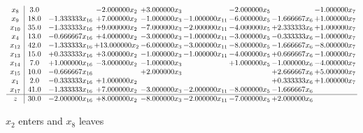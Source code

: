 \documentclass[10pt]{article}
\begin{document}
 \[\begin{array}{c| c c@{\hskip 2pt} c@{\hskip 2pt} c@{\hskip 2pt} c@{\hskip 2pt} c@{\hskip 2pt} c@{\hskip 2pt} c@{\hskip 2pt} }
 x_{8}   &  3.0  &   & -2.000000 x_{2} & + 3.000000 x_{3} &   & -2.000000 x_{5} &   & -1.000000 x_{7}\\
 x_{9}   &  18.0 & -1.333333 x_{16} & + 7.000000 x_{2} & -1.000000 x_{3} & -1.000000 x_{11} & -6.000000 x_{5} & -1.666667 x_{6} & + 1.000000 x_{7}\\
 x_{10}   &  35.0 & -1.333333 x_{16} & + 9.000000 x_{2} & -7.000000 x_{3} & -2.000000 x_{11} & -4.000000 x_{5} & + 2.333333 x_{6} & + 1.000000 x_{7}\\
 x_{4}   &  13.0 & -0.666667 x_{16} & + 4.000000 x_{2} & -3.000000 x_{3} & -1.000000 x_{11} & -3.000000 x_{5} & -0.333333 x_{6} & -1.000000 x_{7}\\
 x_{12}   &  42.0 & -1.333333 x_{16} & + 13.000000 x_{2} & -6.000000 x_{3} & -3.000000 x_{11} & -8.000000 x_{5} & -1.666667 x_{6} & -8.000000 x_{7}\\
 x_{13}   &  15.0 & + 0.333333 x_{16} & + 3.000000 x_{2} & -1.000000 x_{3} & -1.000000 x_{11} & -4.000000 x_{5} & + 0.666667 x_{6} & -1.000000 x_{7}\\
 x_{14}   &  7.0 & + 1.000000 x_{16} & -3.000000 x_{2} & -1.000000 x_{3} &   & + 1.000000 x_{5} & -1.000000 x_{6} & -4.000000 x_{7}\\
 x_{15}   &  10.0 & -0.666667 x_{16} &   & + 2.000000 x_{3} &    &   & + 2.666667 x_{6} & + 5.000000 x_{7}\\
 x_{1}   &  2.0 & -0.333333 x_{16} & + 1.000000 x_{2} &    &    &   & + 0.333333 x_{6} & + 1.000000 x_{7}\\
 x_{17}   &  41.0 & -1.333333 x_{16} & + 7.000000 x_{2} & -3.000000 x_{3} & -2.000000 x_{11} & -8.000000 x_{5} & -1.666667 x_{6} &   \\
\hline
z    &  30.0 & -2.000000 x_{16} & + 8.000000 x_{2} & -8.000000 x_{3} & -2.000000 x_{11} & -7.000000 x_{5} & + 2.000000 x_{6} &   \\
\end{array}\]


 $ x_{2} $ enters and $ x_{8} $ leaves 
\end{document}
